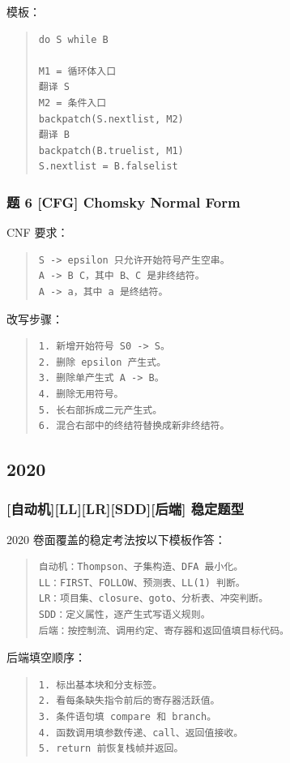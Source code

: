 \documentclass[UTF8,zihao=-4]{ctexart}
\begin{document}
模板：


\begin{quote}
\footnotesize
\begin{verbatim}
do S while B

M1 = 循环体入口
翻译 S
M2 = 条件入口
backpatch(S.nextlist, M2)
翻译 B
backpatch(B.truelist, M1)
S.nextlist = B.falselist
\end{verbatim}
\end{quote}


\subsubsection{题 6 [CFG] Chomsky Normal Form}


CNF 要求：


\begin{quote}
\footnotesize
\begin{verbatim}
S -> epsilon 只允许开始符号产生空串。
A -> B C，其中 B、C 是非终结符。
A -> a，其中 a 是终结符。
\end{verbatim}
\end{quote}


改写步骤：


\begin{quote}
\footnotesize
\begin{verbatim}
1. 新增开始符号 S0 -> S。
2. 删除 epsilon 产生式。
3. 删除单产生式 A -> B。
4. 删除无用符号。
5. 长右部拆成二元产生式。
6. 混合右部中的终结符替换成新非终结符。
\end{verbatim}
\end{quote}


\subsection{2020}


\subsubsection{[自动机][LL][LR][SDD][后端] 稳定题型}


2020 卷面覆盖的稳定考法按以下模板作答：


\begin{quote}
\footnotesize
\begin{verbatim}
自动机：Thompson、子集构造、DFA 最小化。
LL：FIRST、FOLLOW、预测表、LL(1) 判断。
LR：项目集、closure、goto、分析表、冲突判断。
SDD：定义属性，逐产生式写语义规则。
后端：按控制流、调用约定、寄存器和返回值填目标代码。
\end{verbatim}
\end{quote}


后端填空顺序：


\begin{quote}
\footnotesize
\begin{verbatim}
1. 标出基本块和分支标签。
2. 看每条缺失指令前后的寄存器活跃值。
3. 条件语句填 compare 和 branch。
4. 函数调用填参数传递、call、返回值接收。
5. return 前恢复栈帧并返回。
\end{verbatim}
\end{quote}
\end{document}
